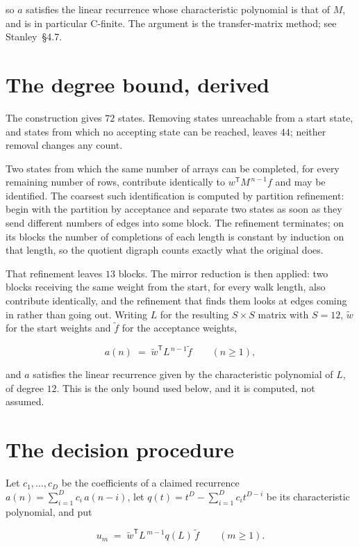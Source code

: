 \documentclass[11pt]{article}
\theoremstyle{definition}
\begin{document}
so $a$ satisfies the linear recurrence whose characteristic polynomial is that of $M$, and is in particular C-finite. The argument is the transfer-matrix method; see Stanley~\S4.7.

\section{The degree bound, derived}

The construction gives $72$ states. Removing states unreachable from a start state, and states from which no accepting state can be reached, leaves $44$; neither removal changes any count.

Two states from which the same number of arrays can be completed, for every remaining number of rows, contribute identically to $w^{\mathsf T}M^{\,n-1}f$ and may be identified. The coarsest such identification is computed by partition refinement: begin with the partition by acceptance and separate two states as soon as they send different numbers of edges into some block. The refinement terminates; on its blocks the number of completions of each length is constant by induction on that length, so the quotient digraph counts exactly what the original does.

That refinement leaves $13$ blocks. The mirror reduction is then applied: two blocks receiving the same weight from the start, for every walk length, also contribute identically, and the refinement that finds them looks at edges coming in rather than going out. Writing $L$ for the resulting $S \times S$ matrix with $S = 12$, $\tilde w$ for the start weights and $\tilde f$ for the acceptance weights,

\[a(n) \;=\; \tilde w^{\mathsf T} L^{\,n-1} \tilde f \qquad (n \ge 1),\]

and $a$ satisfies the linear recurrence given by the characteristic polynomial of $L$, of degree $12$. This is the only bound used below, and it is computed, not assumed.

\section{The decision procedure}

Let $c_1,\dots,c_D$ be the coefficients of a claimed recurrence $a(n) = \sum_{i=1}^{D} c_i\,a(n-i)$, let $q(t) = t^{D} - \sum_{i=1}^{D} c_i t^{D-i}$ be its characteristic polynomial, and put

\[u_m \;=\; \tilde w^{\mathsf T} L^{\,m-1} q(L)\,\tilde f \qquad (m \ge 1).\]
\end{document}
